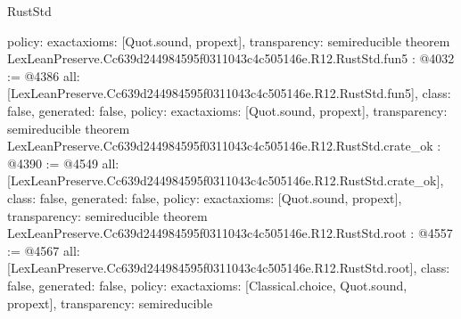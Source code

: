 \begin{lexlean}{RustStd}
\begin{coremodule}
{  policy: exact{axioms: [Quot.sound, propext]},
  transparency: semireducible
}
theorem LexLeanPreserve.Cc639d244984595f0311043c4c505146e.R12.RustStd.fun5 : @4032 := @4386 {
  all: [LexLeanPreserve.Cc639d244984595f0311043c4c505146e.R12.RustStd.fun5],
  class: false,
  generated: false,
  policy: exact{axioms: [Quot.sound, propext]},
  transparency: semireducible
}
theorem LexLeanPreserve.Cc639d244984595f0311043c4c505146e.R12.RustStd.crate_ok : @4390 := @4549 {
  all: [LexLeanPreserve.Cc639d244984595f0311043c4c505146e.R12.RustStd.crate_ok],
  class: false,
  generated: false,
  policy: exact{axioms: [Quot.sound, propext]},
  transparency: semireducible
}
theorem LexLeanPreserve.Cc639d244984595f0311043c4c505146e.R12.RustStd.root : @4557 := @4567 {
  all: [LexLeanPreserve.Cc639d244984595f0311043c4c505146e.R12.RustStd.root],
  class: false,
  generated: false,
  policy: exact{axioms: [Classical.choice, Quot.sound, propext]},
  transparency: semireducible
}


\end{coremodule}
\end{lexlean}
